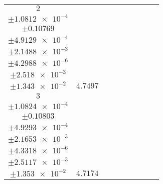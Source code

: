 \documentclass[8pt]{article}
\begin{document}
\begin{longtable}[l]{c c c c c c c c c}
$\num{2}$ & \begin{tabular}[c]{@{}c@{}}$\num{6.4707e-2}$ \\ $\pm\num{1.0812e-4}$\end{tabular} & \begin{tabular}[c]{@{}c@{}}$\num{-1.4842}$ \\ $\pm\num{0.10769}$\end{tabular} & \begin{tabular}[c]{@{}c@{}}$\num{-3.4394}$ \\ $\pm\num{4.9129e-4}$\end{tabular} & \begin{tabular}[c]{@{}c@{}}$\num{4.0415e+3}$ \\ $\pm\num{2.1488e-3}$\end{tabular} & \begin{tabular}[c]{@{}c@{}}$\num{8.0851}$ \\ $\pm\num{4.2988e-6}$\end{tabular} & \begin{tabular}[c]{@{}c@{}}$\num{1.6673}$ \\ $\pm\num{2.518e-3}$\end{tabular} & \begin{tabular}[c]{@{}c@{}}$\num{4.4635}$ \\ $\pm\num{1.343e-2}$\end{tabular} & $\num{4.7497}$\\
$\num{3}$ & \begin{tabular}[c]{@{}c@{}}$\num{6.4494e-2}$ \\ $\pm\num{1.0824e-4}$\end{tabular} & \begin{tabular}[c]{@{}c@{}}$\num{0.51408}$ \\ $\pm\num{0.10803}$\end{tabular} & \begin{tabular}[c]{@{}c@{}}$\num{3.441}$ \\ $\pm\num{4.9293e-4}$\end{tabular} & \begin{tabular}[c]{@{}c@{}}$\num{4.0484e+3}$ \\ $\pm\num{2.1653e-3}$\end{tabular} & \begin{tabular}[c]{@{}c@{}}$\num{8.099}$ \\ $\pm\num{4.3318e-6}$\end{tabular} & \begin{tabular}[c]{@{}c@{}}$\num{1.6585}$ \\ $\pm\num{2.5117e-3}$\end{tabular} & \begin{tabular}[c]{@{}c@{}}$\num{4.5406}$ \\ $\pm\num{1.353e-2}$\end{tabular} & $\num{4.7174}$\\

\end{longtable}
\end{document}
